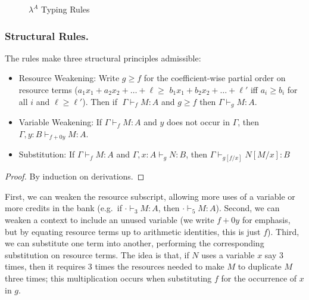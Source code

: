 \begin{figure}
  \vspace{-0.2in}
  \caption{$\lambda^A$ Typing Rules}
  \label{fig:la-ty-rules}
\end{figure}

\subsubsection{Structural Rules.}

The rules make three structural principles admissible:

\begin{theorem} \label{thm:la-structural}\hfill
  \begin{itemize}
\item Resource Weakening: Write $g \ge f$ for the coefficient-wise
  partial order on resource terms ($a_1 x_1 + a_2 x_2 + \ldots + \ell
  \ge$ $b_1 x_1 + b_2 x_2 + \ldots + \ell'$ iff $a_i \ge b_i$ for all
  $i$ and $\ell \ge \ell'$).  Then if $\; \Gamma \vdash_f M : A$ and $g
  \geq f$ then $\Gamma \vdash_g M : A$.

\item Variable Weakening:
If $\Gamma \vdash_f M : A$ and $y$ does not occur in $\Gamma$, then $\Gamma,y:B \vdash_{f+0y} M : A$.
  
\item
    Substitution: 
If $\Gamma \vdash_f M : A$ and $\Gamma, x : A \vdash_g N : B$, then
$\Gamma \vdash_{g[f/x]} N[M/x] : B$

  \end{itemize}
\end{theorem}
\begin{proof}
By induction on derivations.
\end{proof}

First, we can weaken the resource subscript, allowing more uses of a
variable or more credits in the bank (e.g.\ if $\cdot \vdash_3 M : A$,
then $\cdot \vdash_5 M : A$).  Second, we can weaken a context
to include an unused variable (we write $f+0y$ for emphasis, but by
equating resource terms up to arithmetic identities, this is just $f$).
Third, we can substitute one term into another, performing the
corresponding substitution on resource terms.  The idea is that, if $N$
uses a variable $x$ say $3$ times, then it requires 3 times the
resources needed to make $M$ to duplicate $M$ three times; this
multiplication occurs when substituting $f$ for the occurrence of $x$ in
$g$.

